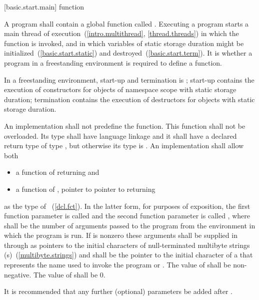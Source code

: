 [basic.start.main]{ function}

\pnum
{}%
A program shall contain a global function called .
Executing a program starts a main thread of execution~(\ref{intro.multithread}, \ref{thread.threads})
in which the  function is invoked,
and in which variables of static storage duration
might be initialized~(\ref{basic.start.static}) and destroyed~(\ref{basic.start.term}).
It is 
whether a program in a freestanding environment is required to define a 
function. \begin{note} In a freestanding environment, start-up and termination is
; start-up contains the
execution of constructors for objects of namespace scope with static storage duration;
termination contains the execution of destructors for objects with static storage
duration. \end{note}

\pnum
An implementation shall not predefine the  function. This
function shall not be overloaded.  Its type shall have \Cpp language linkage
and it shall have a declared return type of type
, but otherwise its type is .
%
An implementation shall allow both
\begin{itemize}
\item a function of \tcode{()} returning  and
\item a function of , pointer to pointer to  returning 
\end{itemize}

%
%
as the type of ~(\ref{dcl.fct}).
%
%
In the latter form, for purposes of exposition, the first function
parameter is called  and the second function parameter is
called , where  shall be the number of
arguments passed to the program from the environment in which the
program is run. If
 is nonzero these arguments shall be supplied in
 through  as pointers to the initial
characters of null-terminated multibyte strings (\ntmbs{}s)~(\ref{multibyte.strings})
and  shall be the pointer to
the initial character of a \ntmbs that represents the name used to
invoke the program or . The value of  shall be
non-negative. The value of  shall be 0. \begin{note} It
is recommended that any further (optional) parameters be added after
. \end{note}

